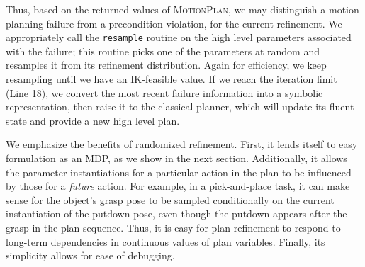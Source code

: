 Thus, based on the returned values of \textsc{MotionPlan}, we may distinguish
a motion planning failure from a precondition violation, for the current
refinement. We appropriately call the \texttt{resample} routine on the high level parameters
associated with the failure; this routine picks one of the parameters at random and
resamples it from its refinement distribution. Again for efficiency, we keep resampling until we
have an IK-feasible value. If we reach the iteration limit (Line 18),
we convert the most recent failure information into a symbolic representation, then raise it
to the classical planner, which will update its fluent state and provide a new
high level plan.

We emphasize the benefits of randomized refinement. First, it
lends itself to easy formulation as an MDP, as we show in the next section.
Additionally, it allows the parameter instantiations for a particular action in
the plan to be influenced by those for a \emph{future} action. For example, in a
pick-and-place task, it can make sense for the object's grasp pose to be sampled
conditionally on the current instantiation of the putdown pose, even though the putdown
appears after the grasp in the plan sequence. Thus, it is easy for plan refinement to
respond to long-term dependencies in continuous values of plan variables. Finally, its simplicity
allows for ease of debugging.